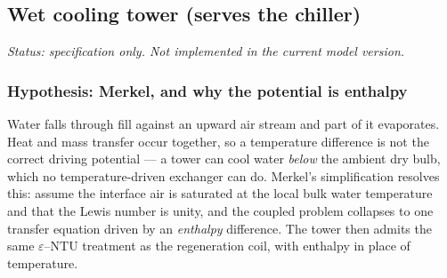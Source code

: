 \documentclass[11pt]{article}
\begin{document}
\subsection{Wet cooling tower (serves the chiller)}
\label{sec:spec:tower}

\emph{Status: specification only. Not implemented in the current model version.}

\subsubsection{Hypothesis: Merkel, and why the potential is enthalpy}
Water falls through fill against an upward air stream and part of it evaporates. Heat and mass
transfer occur together, so a temperature difference is not the correct driving potential --- a tower
can cool water \emph{below} the ambient dry bulb, which no temperature-driven exchanger can do.
Merkel's simplification resolves this: assume the interface air is saturated at the local bulk water
temperature and that the Lewis number is unity, and the coupled problem collapses to one transfer
equation driven by an \emph{enthalpy} difference. The tower then admits the same
$\varepsilon$--$\mathrm{NTU}$ treatment as the regeneration coil, with enthalpy in place of
temperature.
\end{document}
